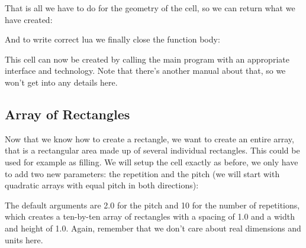 That is all we have to do for the geometry of the cell, so we can return what we have created:

And to write correct lua we finally close the function body:

This cell can now be created by calling the main program with an appropriate interface and technology. Note that there's another manual about that, so we won't get
into any details here.

\subsection{Array of Rectangles}
Now that we know how to create a rectangle, we want to create an entire array, that is a rectangular area made up of several individual rectangles. This could be
used for example as filling. We will setup the cell exactly as before, we only have to add two new parameters: the repetition and the pitch (we will start with
quadratic arrays with equal pitch in both directions):

The default arguments are \num{2.0} for the pitch and \num{10} for the number of repetitions, which creates a ten-by-ten array of rectangles with a spacing of
\num{1.0} and a width and height of \num{1.0}. Again, remember that we don't care about real dimensions and units here.

